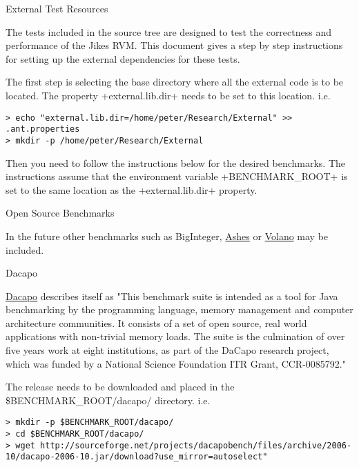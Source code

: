 \begin{section}{External Test Resources}
\label{sec:externaltestresources}

The tests included in the source tree are designed to test the correctness and performance of the Jikes RVM. This document gives a step by step instructions for setting up the external dependencies for these tests.

The first step is selecting the base directory where all the external code is to be located. The property \spverb+external.lib.dir+ needs to be set to this location. i.e.

\begin{lstlisting}
> echo "external.lib.dir=/home/peter/Research/External" >> .ant.properties
> mkdir -p /home/peter/Research/External
\end{lstlisting}

Then you need to follow the instructions below for the desired benchmarks. The instructions assume that the environment variable \spverb+BENCHMARK_ROOT+ is set to the same location as the \spverb+external.lib.dir+ property.

\begin{subsection}{Open Source Benchmarks}

In the future other benchmarks such as BigInteger, \href{http://www.sable.mcgill.ca/ashes/}{Ashes} or \href{http://www.volano.com/benchmarks.html}{Volano} may be included.

\begin{subsubsection}{Dacapo}

\href{http://dacapobench.org}{Dacapo} describes itself as "This benchmark suite is intended as a tool for Java benchmarking by the programming language, memory management and computer architecture communities. It consists of a set of open source, real world applications with non-trivial memory loads. The suite is the culmination of over five years work at eight institutions, as part of the DaCapo research project, which was funded by a National Science Foundation ITR Grant, CCR-0085792."

The release needs to be downloaded and placed in the \$BENCHMARK\_ROOT/dacapo/ directory. i.e.

\begin{lstlisting}
> mkdir -p $BENCHMARK_ROOT/dacapo/
> cd $BENCHMARK_ROOT/dacapo/
> wget http://sourceforge.net/projects/dacapobench/files/archive/2006-10/dacapo-2006-10.jar/download?use_mirror=autoselect"
\end{lstlisting}


\end{subsubsection}
\end{subsection}
\end{section}
